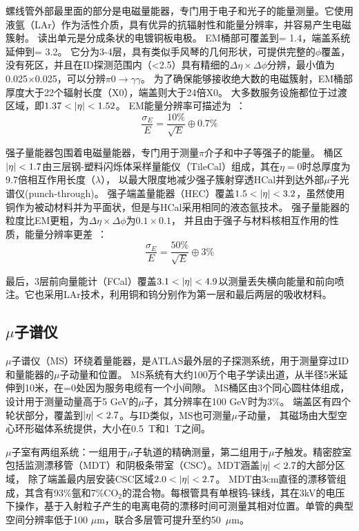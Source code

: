 螺线管外部最里面的部分是电磁量能器，专门用于电子和光子的能量测量。它使用液氩（LAr）作为活性介质，具有优异的抗辐射性和能量分辨率，并容易产生电磁簇射。
读出单元是分成条状的电镀铜板电极。
EM桶部可覆盖到\abseta = 1.4，端盖系统延伸到\abseta = 3.2。
它分为3-4层，具有类似手风琴的几何形状，可提供完整的$\phi$覆盖，没有死区，并且在ID探测范围内（\abseta <2.5）具有精细的$\Delta \eta\times\Delta\phi$分辨，最小值为0.025$\times$0.025，可以分辨$\pi0\rightarrow \gamma\gamma$。
为了确保能够接收绝大数的电磁簇射，EM桶部厚度大于22个辐射长度（X0），端盖则大于24倍X0。
大多数服务设施都位于过渡区域，即$1.37<\abseta<1.52$。
EM能量分辨率可描述为~\cite{ATLAS_Collaboration_2008}：
\begin{equation}
\frac{\sigma_{E}}{E}=\frac{10\%}{\sqrt{E}}\oplus0.7\%
\end{equation}

强子量能器包围着电磁量能器，专门用于测量$\pi$介子和中子等强子的能量。 桶区$|\eta|<1.7$由三层钢-塑料闪烁体采样量能仪（TileCal）组成，其在$\eta = 0$时总厚度为9.7倍相互作用长度（$\lambda$），
以最大限度地减少强子簇射穿透HCal并到达外部$\mu$子光谱仪(punch-through)。
强子端盖量能器（HEC）覆盖$1.5<\abseta<3.2$，虽然使用铜作为被动材料并为平面状，但是与HCal采用相同的液态氩技术。
强子量能器的粒度比EM更粗，为$\Delta \eta\times\Delta\phi$为$0.1\times0.1$，
并且由于强子与材料核相互作用的性质，能量分辨率更差~\cite{ATLAS_Collaboration_2008}：
\begin{equation}
\frac{\sigma_{E}}{E}=\frac{50\%}{\sqrt{E}}\oplus3\%
\end{equation}

最后，3层前向量能计（FCal）覆盖$3.1<\abseta<4.9$以测量丢失横向能量和前向喷注。它也采用LAr技术，利用铜和钨分别作为第一层和最后两层的吸收材料。

\subsection{$\mu$子谱仪}
$\mu$子谱仪（MS）环绕着量能器，是ATLAS最外层的子探测系统，用于测量穿过ID和量能器的$\mu$子动量和位置。 MS系统有大约100万个电子学读出道，从半径5米延伸到10米，在\abseta =0处因为服务电缆有一个小间隙。
MS桶区由3个同心圆柱体组成，设计用于测量动量高于5 GeV的$\mu$子，其分辨率在100 GeV时为3\%。 端盖区有四个轮状部分，覆盖到$|\eta|<2.7$。与ID类似，MS也可测量$\mu$子动量，
其磁场由大型空心环形磁体系统提供，大小在0.5~T和1~T之间。

$\mu$子室有两组系统：一组用于$\mu$子轨道的精确测量，第二组用于$\mu$子触发。精密腔室包括监测漂移管（MDT）\cite{Bauer:2016gyg}和阴极条带室（CSC）\cite{Argyropoulos:2009zz}。MDT涵盖$|\eta|<2.7$的大部分区域，
 除了端盖最内层安装CSC区域$2.0<\abseta<2.7$。
 MDT由3cm直径的漂移管组成，其含有93\%氩和7\%CO$_{2}$的混合物。每根管具有单根钨-铼线，其在3kV的电压下操作，基于入射粒子产生的电离电荷的漂移时间可测量其相对位置。单管的典型空间分辨率低于100 $\mu\text{m}$，联合多层管可提升至约50~$\mu\text{m}$。

